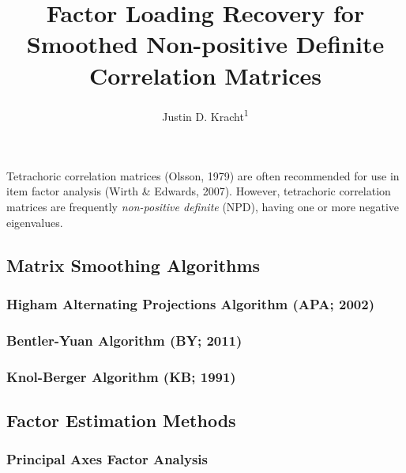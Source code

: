 \documentclass[man]{apa6}
\title{Factor Loading Recovery for Smoothed Non-positive Definite Correlation Matrices}
\author{Justin D. Kracht\textsuperscript{1}}
\date{}
\affiliation{
\vspace{0.5cm}
\textsuperscript{1} University of Minnesota}
\begin{document}
\maketitle

\newcommand{\Rsm}{\mathbf{R}_{\textrm{Sm}}}

Tetrachoric correlation matrices (Olsson, 1979) are often recommended for use in item factor analysis (Wirth \& Edwards, 2007). However, tetrachoric correlation matrices are frequently \emph{non-positive definite} (NPD), having one or more negative eigenvalues.

\hypertarget{matrix-smoothing-algorithms}{%
\subsection{Matrix Smoothing Algorithms}\label{matrix-smoothing-algorithms}}

\hypertarget{higham-alternating-projections-algorithm-apa-2002}{%
\subsubsection{Higham Alternating Projections Algorithm (APA; 2002)}\label{higham-alternating-projections-algorithm-apa-2002}}

\hypertarget{bentler-yuan-algorithm-by-2011}{%
\subsubsection{Bentler-Yuan Algorithm (BY; 2011)}\label{bentler-yuan-algorithm-by-2011}}

\hypertarget{knol-berger-algorithm-kb-1991}{%
\subsubsection{Knol-Berger Algorithm (KB; 1991)}\label{knol-berger-algorithm-kb-1991}}

\hypertarget{factor-estimation-methods}{%
\subsection{Factor Estimation Methods}\label{factor-estimation-methods}}

\hypertarget{principal-axes-factor-analysis}{%
\subsubsection{Principal Axes Factor Analysis}\label{principal-axes-factor-analysis}}
\end{document}
